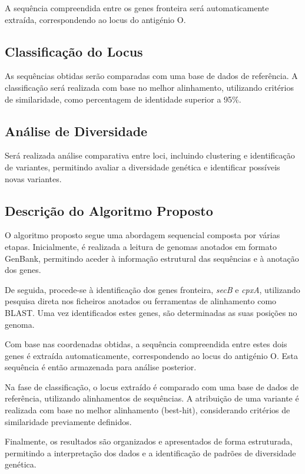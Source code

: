 \documentclass[a4paper,11pt]{article}
\begin{document}
A sequência compreendida entre os genes fronteira será automaticamente extraída, correspondendo ao locus do antigénio O.

\subsection{Classificação do Locus}

As sequências obtidas serão comparadas com uma base de dados de referência. A classificação será realizada com base no melhor alinhamento, utilizando critérios de similaridade, como percentagem de identidade superior a 95\%.

\subsection{Análise de Diversidade}

Será realizada análise comparativa entre loci, incluindo clustering e identificação de variantes, permitindo avaliar a diversidade genética e identificar possíveis novas variantes.

\subsection{Descrição do Algoritmo Proposto}

O algoritmo proposto segue uma abordagem sequencial composta por várias etapas. Inicialmente, é realizada a leitura de genomas anotados em formato GenBank, permitindo aceder à informação estrutural das sequências e à anotação dos genes.

De seguida, procede-se à identificação dos genes fronteira, \textit{secB} e \textit{cpxA}, utilizando pesquisa direta nos ficheiros anotados ou ferramentas de alinhamento como BLAST. Uma vez identificados estes genes, são determinadas as suas posições no genoma.

Com base nas coordenadas obtidas, a sequência compreendida entre estes dois genes é extraída automaticamente, correspondendo ao locus do antigénio O. Esta sequência é então armazenada para análise posterior.

Na fase de classificação, o locus extraído é comparado com uma base de dados de referência, utilizando alinhamentos de sequências. A atribuição de uma variante é realizada com base no melhor alinhamento (best-hit), considerando critérios de similaridade previamente definidos.

Finalmente, os resultados são organizados e apresentados de forma estruturada, permitindo a interpretação dos dados e a identificação de padrões de diversidade genética.
\end{document}
